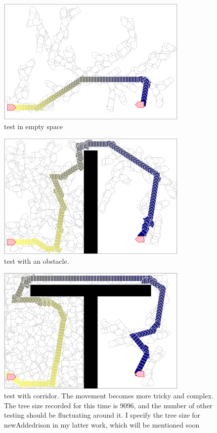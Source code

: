 \documentclass{article}
\begin{document}
\begin{figure}[!h]
\centering
\includegraphics[width=0.827\textwidth]{2-1.png}
\caption{test in empty space}
\label{2-1}
\end{figure}

\begin{figure}[!h]
\centering
\includegraphics[width=0.827\textwidth]{2-2.png}
\caption{test with an obstacle.}
\label{2-2}
\end{figure}

\begin{figure}[!h]
\centering
\includegraphics[width=0.827\textwidth]{2-3.png}
\caption{test with corridor. The movement becomes more tricky and complex. The tree size recorded for this time is 9096, and the number of other testing should be fluctuating around it. I specify the tree size for newAddedrison in my latter work, which will be mentioned soon}
\label{2-3}
\end{figure}
\end{document}
